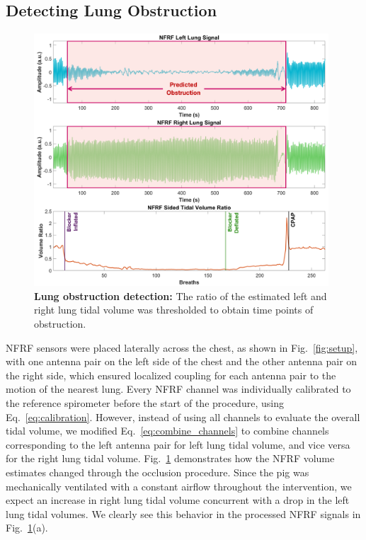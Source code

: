 \documentclass[journal,twoside,web]{ieeecolor}
\begin{document}
\subsection{Detecting Lung Obstruction}
\begin{figure}[ht]
    \centering
    \includegraphics[width=0.98\textwidth]{occlusion_lr.jpg}
    \caption{\textbf{Lung obstruction detection:} The ratio of the estimated left and right lung tidal volume was thresholded to obtain time points of obstruction.}
    \label{fig:occlusion_lr}
\end{figure}
NFRF sensors were placed laterally across the chest, as shown in Fig.~\ref{fig:setup}, with one antenna pair on the left side of the chest and the other antenna pair on the right side, which ensured localized coupling for each antenna pair to the motion of the nearest lung. Every NFRF channel was individually calibrated to the reference spirometer before the start of the procedure, using Eq.~\ref{eq:calibration}. However, instead of using all channels to evaluate the overall tidal volume, we modified Eq.~\ref{eq:combine_channels} to combine channels corresponding to the left antenna pair for left lung tidal volume, and vice versa for the right lung tidal volume.  Fig.~\ref{fig:occlusion_lr} demonstrates how the NFRF volume estimates changed through the occlusion procedure. Since the pig was mechanically ventilated with a constant airflow throughout the intervention, we expect an increase in right lung tidal volume concurrent with a drop in the left lung tidal volumes. We clearly see this behavior in the processed NFRF signals in Fig.~\ref{fig:occlusion_lr}(a). \\
\end{document}
